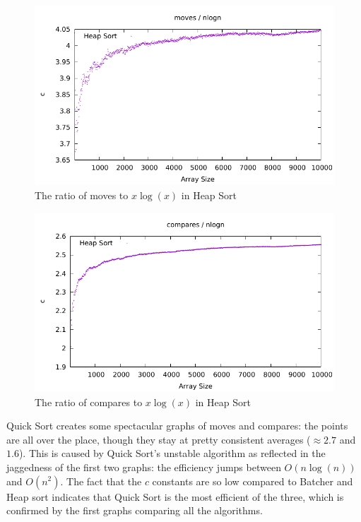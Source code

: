 \documentclass[12pt]{article}
\begin{document}
\begin{figure}[H]\begin{centering}
\includegraphics{plots/nlogn-moves-heap.pdf}\caption{The ratio of moves to $x\log(x)$ in Heap Sort}
\end{centering}\end{figure}
\begin{figure}[H]\begin{centering}
\includegraphics{plots/nlogn-compares-heap.pdf}\caption{The ratio of compares to $x\log(x)$ in Heap Sort}
\end{centering}\end{figure}

Quick Sort creates some spectacular graphs of moves and compares: the points are all over the place, though they stay at pretty consistent averages ($\approx 2.7$ and $1.6$). This is caused by Quick Sort's unstable algorithm as reflected in the jaggedness of the first two graphs: the efficiency jumps between $O(n\log(n))$ and $O(n^2)$. The fact that the $c$ constants are so low compared to Batcher and Heap sort indicates that Quick Sort is the most efficient of the three, which is confirmed by the first graphs comparing all the algorithms.
\end{document}
